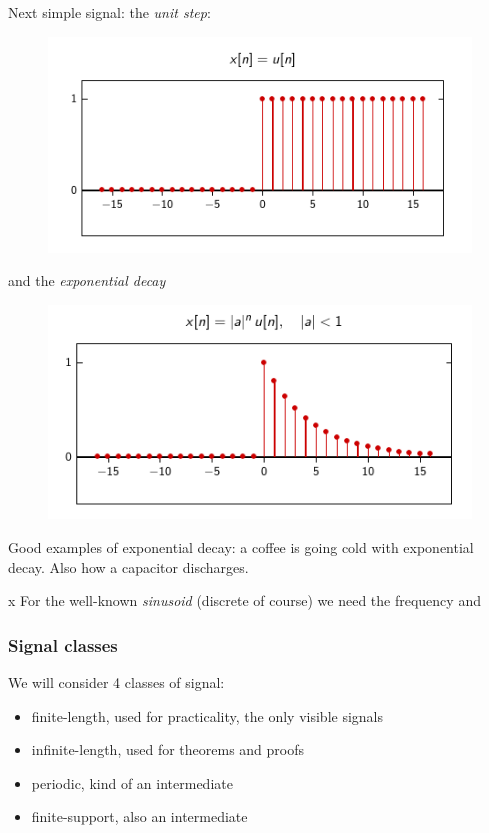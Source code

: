\documentclass[11pt,a4paper]{article}
\numberwithin{equation}{section}
\begin{document}
Next simple signal: the \textit{unit step}:
\begin{figure}
    \includegraphics[scale=0.6]{images/unit_signal}
\end{figure}
and the \textit{exponential decay}
\begin{figure}
    \includegraphics[scale=0.6]{images/expo_decay}
\end{figure}
\begin{example}
    Good examples of exponential decay: a coffee is going cold with exponential decay. Also how a capacitor discharges.
\end{example}x
For the well-known \textit{sinusoid} (discrete of course) we need the frequency and 
\subsubsection{Signal classes}
We will consider 4 classes of signal: 
\begin{itemize}
    \item finite-length, used for practicality, the only visible signals
    \item infinite-length, used for theorems and proofs
    \item periodic, kind of an intermediate
    \item finite-support, also an intermediate
\end{itemize}
\end{document}
